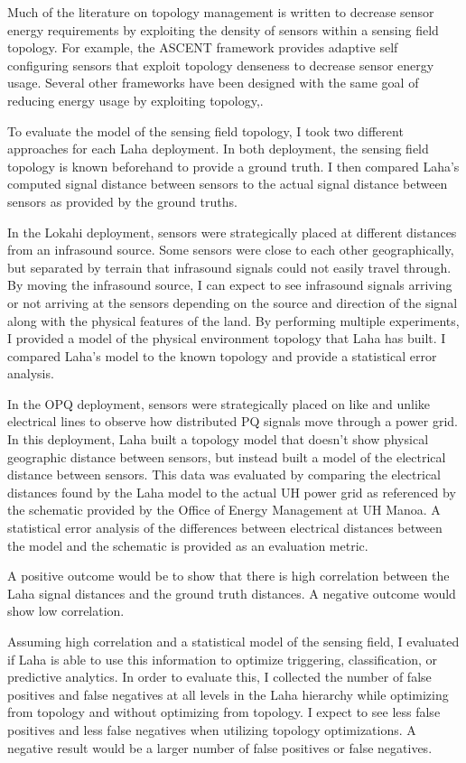 Much of the literature on topology management is written to decrease sensor energy requirements by exploiting the density of sensors within a sensing field topology. For example, the ASCENT\cite{cerpa2004ascent} framework provides adaptive self configuring sensors that exploit topology denseness to decrease sensor energy usage. Several other frameworks have been designed with the same goal of reducing energy usage by exploiting topology\cite{schurgers2002stem},\cite{schurgers2002topology}.

To evaluate the model of the sensing field topology, I took two different approaches for each Laha deployment. In both deployment, the sensing field topology is known beforehand to provide a ground truth. I then compared Laha's computed signal distance between sensors to the actual signal distance between sensors as provided by the ground truths.

In the Lokahi deployment, sensors were strategically placed at different distances from an infrasound source. Some sensors were close to each other geographically, but separated by terrain that infrasound signals could not easily travel through. By moving the infrasound source, I can expect to see infrasound signals arriving or not arriving at the sensors depending on the source and direction of the signal along with the physical features of the land. By performing multiple experiments, I provided a model of the physical environment topology that Laha has built. I compared Laha's model to the known topology and provide a statistical error analysis.

In the OPQ deployment, sensors were strategically placed on like and unlike electrical lines to observe how distributed PQ signals move through a power grid. In this deployment, Laha built a topology model that doesn't show physical geographic distance between sensors, but instead built a model of the electrical distance between sensors. This data was evaluated by comparing the electrical distances found by the Laha model to the actual UH power grid as referenced by the schematic provided by the Office of Energy Management at UH Manoa. A statistical error analysis of the differences between electrical distances between the model and the schematic is provided as an evaluation metric.

A positive outcome would be to show that there is high correlation between the Laha signal distances and the ground truth distances. A negative outcome would show low correlation.

Assuming high correlation and a statistical model of the sensing field, I evaluated if Laha is able to use this information to optimize triggering, classification, or predictive analytics. In order to evaluate this, I collected the number of false positives and false negatives at all levels in the Laha hierarchy while optimizing from topology and without optimizing from topology. I expect to see less false positives and less false negatives when utilizing topology optimizations. A negative result would be a larger number of false positives or false negatives.

